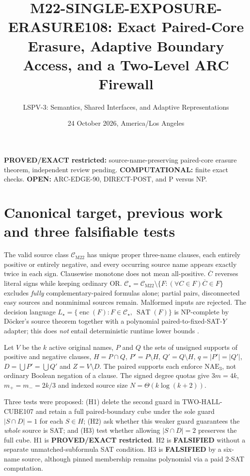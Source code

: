 \documentclass[11pt]{article}
\title{M22-SINGLE-EXPOSURE-ERASURE108: Exact Paired-Core Erasure, Adaptive Boundary Access, and a Two-Level ARC Firewall}
\author{LSPV-3: Semantics, Shared Interfaces, and Adaptive Representations}
\date{24 October 2026, America/Los Angeles}
\newcommand{\CM}{\mathcal C_{\mathrm{M22}}}
\newcommand{\CS}{\mathcal C_{\star}}
\newcommand{\SAT}{\operatorname{SAT}}
\begin{document}
\maketitle
\noindent\textbf{PROVED/EXACT restricted:} source-name-preserving paired-core erasure theorem, independent review pending.
\textbf{COMPUTATIONAL:} finite exact checks. \textbf{OPEN:} ARC-EDGE-90, DIRECT-POST, and P versus NP.

\section{Canonical target, previous work and three falsifiable tests}
The valid source class $\CM$ has unique proper three-name clauses, each entirely positive or entirely negative, and every occurring source name appears exactly twice in each sign. Clausewise monotone does not mean all-positive. $\overline C$ reverses literal signs while keeping ordinary OR. $\CS=\CM\setminus\{F:(\forall C\in F)\overline C\in F\}$ excludes \emph{fully} complementary-paired formulas alone; partial pairs, disconnected easy sources and nonminimal sources remain. Malformed inputs are rejected. The decision language $L_{\star}=\{\operatorname{enc}(F):F\in\CS,\ \SAT(F)\}$ is NP-complete by D\"ocker's source theorem together with a polynomial paired-to-fixed-SAT-$Y$ adapter; this does \emph{not} entail deterministic runtime lower bounds \cite{docker}.

Let $V$ be the $k$ active original names, $P$ and $Q$ the sets of unsigned supports of positive and negative clauses, $H=P\cap Q$, $P'=P\setminus H$, $Q'=Q\setminus H$, $q=|P'|=|Q'|$, $D=\bigcup P'=\bigcup Q'$ and $Z=V\setminus D$. The paired supports each enforce $\mathrm{NAE}_3$, not ordinary Boolean negation of a clause. The signed degree quotas give $3m=4k$, $m_+=m_-=2k/3$ and indexed source size $N=\Theta(k\log(k+2))$.

Three tests were proposed: (H1) delete the second guard in TWO-HALL-CUBE107 and retain a full paired-boundary cube under the sole guard $|S\cap D|=1$ for each $S\in H$; (H2) ask whether this weaker guard guarantees the \emph{whole} source is SAT; and (H3) test whether allowing $|S\cap D|=2$ preserves the full cube. H1 is \textbf{PROVED/EXACT restricted}. H2 is \textbf{FALSIFIED} without a separate unmatched-subformula SAT condition. H3 is \textbf{FALSIFIED} by a six-name source, although pinned membership remains polynomial via a paid 2-SAT computation.
\end{document}
